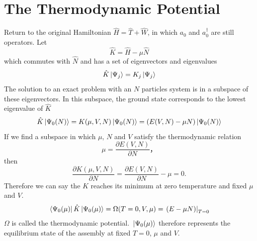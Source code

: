 \documentclass[12pt]{article}
\begin{document}
\section{The Thermodynamic Potential}
Return to the original Hamiltonian $\hat{H}=\hat{T}+\hat{W}$, in which $a_0$ and 
$a^\dagger_0$ are still operators. Let 
\begin{equation}
    \hat{K}=\hat{H}-\mu\hat{N}
\end{equation}
which commutes with $\hat{N}$ and has a set of eigenvectors and eigenvalues 
\begin{equation}
    \hat{K}\ket*{\Psi_j}=K_j\ket*{\Psi_j}
\end{equation}
The solution to an exact problem with an $N$ particles system is in a subspace of 
these eigenvectors. In this subspace, the ground state corresponds to the lowest 
eigenvalue of $\hat{K}$
\begin{equation}
    \hat{K}\ket*{\Psi_0(N)}=K(\mu,V,N)\ket*{\Psi_{0}(N)}=(E(V,N)-\mu N)\ket*{\Psi_0(N)}
\end{equation}
If we find a subspace in which $\mu$, $N$ and $V$ satisfy the thermodynamic relation 
\begin{equation}
    \mu=\frac{\partial E(V,N)}{\partial N}，
\end{equation}
then 
\begin{equation}
    \frac{\partial K(\mu,V,N)}{\partial N}=\frac{\partial E(V,N)}{\partial N}-\mu=0.
\end{equation}
Therefore we can say the $K$ reaches its minimum at zero temperature and fixed 
$\mu$ and $V$.
\begin{equation}
    \bra*{\Psi_{0}(\mu)}\hat{K}\ket*{\Psi_{0}(\mu)}=\Omega(T=0,V,\mu)=
    \left.(E-\mu N)\right|_{T=0}
\end{equation} 
$\Omega$ is called the thermodynamic potential. $\ket*{\Psi_0(\mu)}$ therefore represents 
the equilibrium state of the assembly at fixed $T=0$, $\mu$ and $V$.
\end{document}

